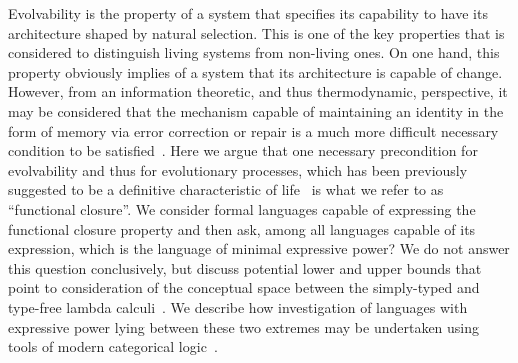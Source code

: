 Evolvability is the property of a system that specifies its capability to have its architecture shaped by natural selection. This is one of the key properties that is considered to distinguish living systems from non-living ones. On one hand, this property obviously implies of a system that its architecture is capable of change. However, from an information theoretic, and thus thermodynamic, perspective, it may be considered that the mechanism capable of maintaining an identity in the form of memory via error correction or repair is a much more difficult necessary condition to be satisfied~\cite{Gacs2001}. Here we argue that one necessary precondition for evolvability and thus for evolutionary processes, which has been previously suggested to be a definitive characteristic of life~\cite{Rosen1972,Rosen1991,Zafiris2012,Mossio2009,Letelier2006} is what we refer to as ``functional closure''. We consider formal languages capable of expressing the functional closure property and then ask, among all languages capable of its expression, which is the language of minimal expressive power?  We do not answer this question conclusively, but discuss potential lower and upper bounds that point to consideration of the conceptual space between the simply-typed and type-free lambda calculi~\cite{Barendregt1985}. We describe how investigation of languages with expressive power lying between these two extremes may be undertaken using tools of modern categorical logic~\cite{Crole1994a,Awodey2006}.
